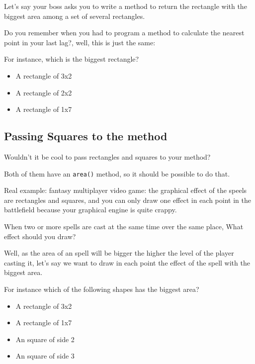 \documentclass[a4paper, 9pt]{extarticle}
\begin{document}
Let's say your boss asks you to write a method to return the rectangle with the
biggest area among a set of several rectangles.

Do you remember when you had to program a method to calculate the nearest point
in your last lag?, well, this is just the same:

For instance, which is the biggest rectangle?

\begin{itemize}
  \item A rectangle of 3x2
  \item A rectangle of 2x2
  \item A rectangle of 1x7
\end{itemize}










\subsection{Passing Squares to the method}

Wouldn't it be cool to pass rectangles and squares to your method?

Both of them have an \verb+area()+ method, so it should be possible to do that.

Real example: fantasy multiplayer video game: the graphical effect of the
speels are rectangles and squares, and you can only draw one effect in each
point in the battlefield because your graphical engine is quite crappy.

When two or more spells are cast at the same time over the same place, What
effect should you draw?

Well, as the area of an spell will be bigger the higher the level of the player
casting it, let's say we want to draw in each point the effect of the spell
with the biggest area.

For instance which of the following shapes has the biggest area?

\begin{itemize}
  \item A rectangle of 3x2
  \item A rectangle of 1x7
  \item An square of side 2
  \item An square of side 3
\end{itemize}
\end{document}
